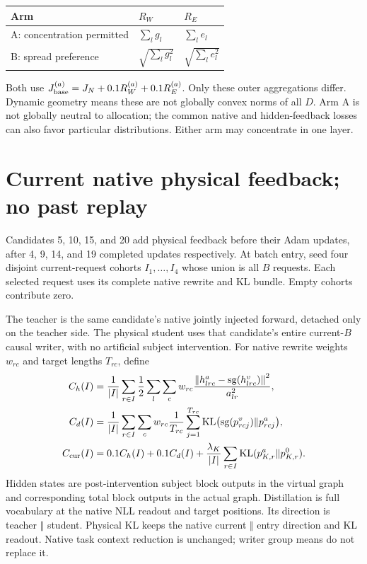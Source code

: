 \documentclass[10pt]{article}
\newcommand{\KL}{\operatorname{KL}}
\newcommand{\sg}{\operatorname{sg}}
\newcommand{\norm}[1]{\left\lVert#1\right\rVert}
\begin{document}
\begin{center}
\begin{tabular}{lll}
\toprule
Arm & $R_W$ & $R_E$\\
\midrule
A: concentration permitted & $\sum_lg_l$ & $\sum_le_l$\\
B: spread preference & $\sqrt{\sum_lg_l^2}$ & $\sqrt{\sum_le_l^2}$\\
\bottomrule
\end{tabular}
\end{center}
Both use $J_{\rm base}^{(a)}=J_N+0.1R_W^{(a)}+0.1R_E^{(a)}$.
Only these outer aggregations differ. Dynamic geometry means these are
not globally convex norms of all $D$. Arm A is not globally neutral to
allocation; the common native and hidden-feedback losses can also favor
particular distributions. Either arm may concentrate in one layer.

\newpage
\section{Current native physical feedback; no past replay}
Candidates 5, 10, 15, and 20 add physical feedback before their Adam
updates, after 4, 9, 14, and 19 completed updates respectively. At batch
entry, seed four disjoint current-request cohorts $I_1,\ldots,I_4$ whose
union is all $B$ requests. Each selected request uses its complete native
rewrite and KL bundle. Empty cohorts contribute zero.

The teacher is the same candidate's native jointly injected forward,
detached only on the teacher side. The physical student uses that
candidate's entire current-$B$ causal writer, with no artificial subject
intervention. For native rewrite weights $w_{rc}$ and target lengths
$T_{rc}$, define
\begin{align}
 C_h(I)&=\frac1{|I|}\sum_{r\in I}\frac12\sum_l\sum_c w_{rc}
     \frac{\norm{h^a_{lrc}-\sg(h^v_{lrc})}^2}{a_{lr}^2},\\
 C_d(I)&=\frac1{|I|}\sum_{r\in I}\sum_c w_{rc}\frac1{T_{rc}}
    \sum_{j=1}^{T_{rc}}\KL\bigl(\sg(p^v_{rcj})\Vert p^a_{rcj}\bigr),\\
 C_{\rm cur}(I)&=0.1C_h(I)+0.1C_d(I)
  +\frac{\lambda_K}{|I|}\sum_{r\in I}\KL(p^a_{K,r}\Vert p^0_{K,r}).
\end{align}
Hidden states are post-intervention subject block outputs in the virtual
graph and corresponding total block outputs in the actual graph.
Distillation is full vocabulary at the native NLL readout and target
positions. Its direction is teacher $\Vert$ student. Physical KL keeps
the native current $\Vert$ entry direction and KL readout. Native task
context reduction is unchanged; writer group means do not replace it.
\end{document}
